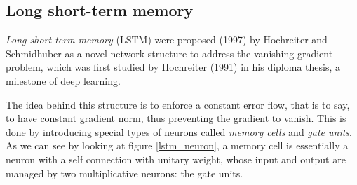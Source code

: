 
\subsection{Long short-term memory} 

\textit{Long short-term memory} (LSTM) were proposed (1997) by Hochreiter and Schmidhuber\cite{lstm} as a novel network 
structure to address the vanishing gradient problem, which was first studied by Hochreiter (1991) in his diploma 
thesis, a milestone of deep learning.

The idea behind this structure is to enforce a constant error flow, that is to say, to have constant gradient norm, 
thus preventing the gradient to vanish. This is done by introducing special types of neurons called \textit{memory 
cells} and \textit{gate units}. As we can see by looking at figure \ref{lstm_neuron}, a memory cell is essentially a 
neuron with a self connection with unitary weight, whose input and output are managed by two multiplicative neurons: 
the gate units.


